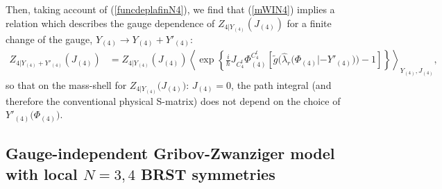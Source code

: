 \documentclass[10pt]{article}
\begin{document}
Then, taking account of (\ref{funcdeplafinN4}),
we find that (\ref{mWIN4}) implies a relation which describes
the gauge dependence of $Z_{4|Y_{(4)}}({J}_{(4)})$ for a finite change
of the gauge, $Y_{(4)}\rightarrow Y_{(4)}+ Y'_{(4)}$:%
\begin{align}
Z_{4|Y_{(4)}+ Y'_{(4)}}({J}_{(4)})  &  =Z_{4|Y_{(4)}}({J}_{(4)})\left\langle\exp\left\{ \frac{i}{\hbar}{J}_{C^t_4}{\Phi}^{C^t_4}_{(4)}\left[ \tilde{g}\big(\hat{\lambda}_r\big({\Phi}_{(4)}|-Y'_{(4)}\big)\big)-1\right]\right\}
\right\rangle _{Y_{(4)},{J}_{(4)}} , \label{GDInewN4}%
\end{align}
so that on the mass-shell for $Z_{4|Y_{(4)}}\big({J}_{(4)}\big)$:  ${J}_{(4)}=0$, the path integral (and therefore
the conventional physical S-matrix) does not depend on the choice
of $Y'_{(4)}\big({\Phi}_{(4)}\big)$.


\subsection{Gauge-independent Gribov-Zwanziger model with local $N=3,4$ BRST symmetries}

\label{NkWIGZ}
\end{document}
